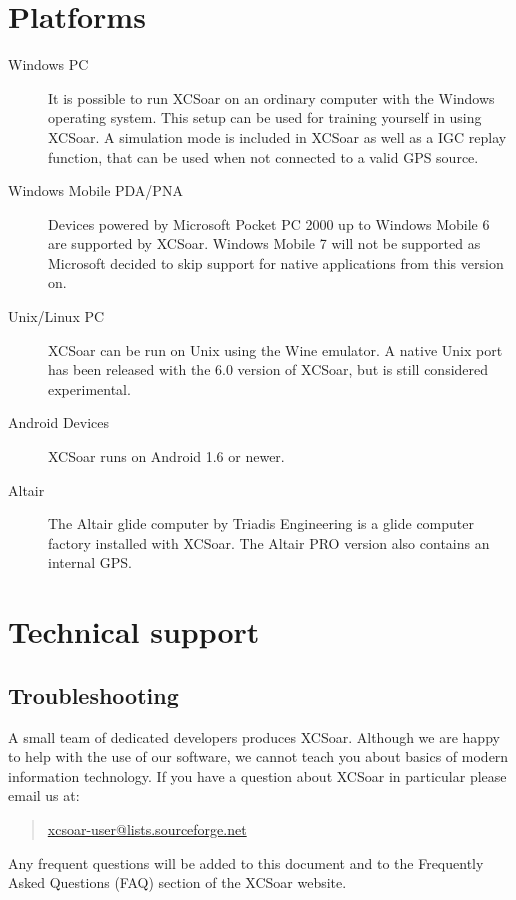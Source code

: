 \section{Platforms}
\begin{description}
\item[Windows PC]
It is possible to run XCSoar on an ordinary computer with the Windows
operating system. This setup can be used for training yourself in using XCSoar.
A simulation mode is included in XCSoar as well as a IGC replay function, that
can be used when not connected to a valid GPS source.
\item[Windows Mobile PDA/PNA]
Devices powered by Microsoft Pocket PC 2000 up to Windows Mobile 6 are
supported by XCSoar. Windows Mobile 7 will not be supported as Microsoft decided
to skip support for native applications from this version on.
\item[Unix/Linux PC]
XCSoar can be run on Unix using the Wine emulator. A native Unix port
has been released with the 6.0 version of XCSoar, but is still
considered experimental.
\item[Android Devices]
XCSoar runs on Android 1.6 or newer.
\item[Altair]
The Altair glide computer by Triadis Engineering is a glide computer
factory installed with XCSoar.  The Altair PRO version also contains
an internal GPS.
\end{description}



\section{Technical support}

\subsection*{Troubleshooting}
A small team of dedicated developers produces XCSoar. Although we are
happy to help with the use of our software, we cannot teach you about
basics of modern information technology. If you have a question about XCSoar in
particular please email us at: 
\begin{quote}
\href{mailto:xcsoar-user@lists.sourceforge.net}{xcsoar-user@lists.sourceforge.net}
\end{quote}

Any frequent questions will be added to this document and to the Frequently
Asked Questions (FAQ) section of the XCSoar website.

